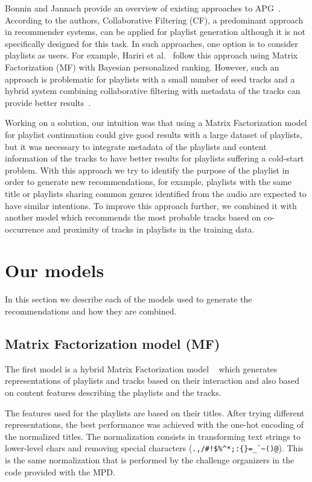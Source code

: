 Bonnin and Jannach provide an overview of existing approaches to APG~\cite{bonnin2015automated}. According to the authors, Collaborative Filtering (CF), a predominant approach in recommender systems, can be applied for playlist generation although it is not specifically designed for this task. In such approaches, one option is to consider playlists as users. For example, Hariri et al.~\cite{hariri2012context} follow this approach %
using Matrix Factorization (MF) with Bayesian personalized ranking. However, such an approach is problematic for playlists with a small number of seed tracks and a hybrid system combining collaborative filtering with metadata of the tracks can provide better results~\cite{bonnin2015automated}.%

Working on a solution, our intuition was that using a Matrix Factorization model for playlist continuation could give good results with a large dataset of playlists, but it was necessary to integrate metadata of the playlists and content information of the tracks to have better results for playlists suffering a cold-start problem. With this approach we try to identify the purpose of the playlist in order to generate new recommendations, for example, playlists with the same title or playlists sharing common genres identified from the audio are expected to have similar intentions. To improve this approach further, we combined it with another model which recommends the most probable tracks based on co-occurrence and proximity of tracks in playlists in the training data.

\section{Our models}

In this section we describe each of the models used to generate the recommendations and how they are combined. 

\subsection{Matrix Factorization model (MF)}

The first model is a hybrid Matrix Factorization model ~\cite{kula2015metadata} which generates representations of playlists and tracks based on their interaction and also based on content features describing the playlists and the tracks.

The features used for the playlists are based on their titles. After trying different representations, the best performance was achieved with the one-hot encoding of the normalized titles. The normalization consists in transforming text strings to lower-level chars and removing special characters (\verb|.,/#!$%^*;:{}=_`~()@|). This is the same normalization that is performed by the challenge organizers in the code provided with the MPD.

